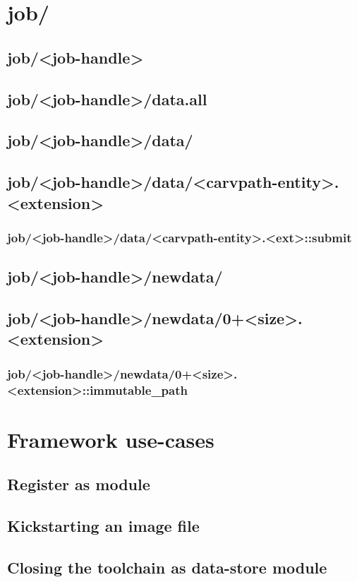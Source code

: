 \section{job/}
\subsection{job/<job-handle>}
\subsection{job/<job-handle>/data.all}
\subsection{job/<job-handle>/data/}
\subsection{job/<job-handle>/data/<carvpath-entity>.<extension>}
\subsubsection{job/<job-handle>/data/<carvpath-entity>.<ext>::submit}
\subsection{job/<job-handle>/newdata/}
\subsection{job/<job-handle>/newdata/0+<size>.<extension>}
\subsubsection{job/<job-handle>/newdata/0+<size>.<extension>::immutable\_path}

\section{Framework use-cases}
\subsection{Register as module}
\subsection{Kickstarting an image file}
\subsection{Closing the toolchain as data-store module}
